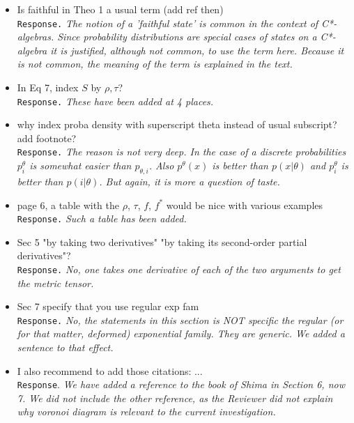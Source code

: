 \documentclass[a4paper,12pt]{article}
\begin{document}
\begin{itemize}
\item Is faithful in Theo 1 a usual term (add ref then) \\
{\tt Response.} {\it The notion of a 'faithful state' is common in the context of C*-algebras.
 Since probability distributions are special cases of states on a C*-algebra it is
 justified, although not common, to use the term here. Because it is not common, the meaning of
the term is explained in the text. }

\item In Eq 7, index $S$ by $\rho,\tau$? \\
{\tt Response.} {\it These have been added at 4 places.}

\item why index proba density with superscript theta instead of usual subscript? add footnote? \\
{\tt Response.} {\it The reason is not very deep. In the case of a discrete probabilities $p^\theta_i$
 is somewhat easier than $p_{\theta,i}$. Also $p^\theta(x)$ is better than $p(x|\theta)$ and
 $p^\theta_i$ is better than $p(i|\theta)$. But again, it is more a question of taste. }

\item page 6, a table with the $\rho$, $\tau$, $f$, $f^*$ would be nice with various examples \\
{\tt Response.} {\it Such a table has been added.}

\item Sec 5 "by taking two derivatives" "by taking its second-order partial derivatives"? \\
{\tt Response.} {\it No, one takes one derivative of each of the two arguments to get the metric tensor.}

\item Sec 7 specify that you use regular exp fam \\
{\tt Response.} {\it No, the statements in this section is NOT specific the regular (or for that matter, deformed) exponential family. They are generic. We added a sentence to that effect.}

\item I also recommend to add those citations: ... \\
{\tt Response}. {\it We have added a reference to the book of Shima in Section 6, now 7. We did not include the other reference, as the Reviewer did not explain why voronoi diagram is relevant to the current investigation.}
% 
% 

\end{itemize}
\end{document}
